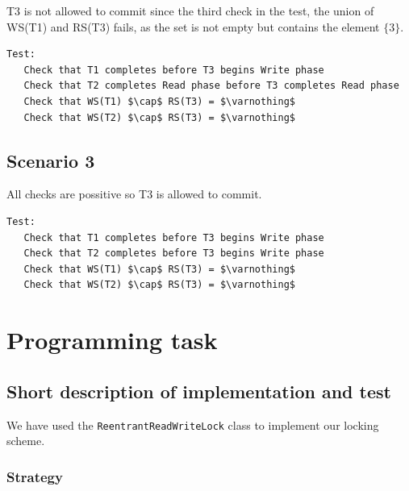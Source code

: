 \documentclass{article}
\theoremstyle{plain}
\theoremstyle{nonumberplain}
\begin{document}
T3 is not allowed to commit since the third check in the test, the union of WS(T1) and RS(T3) fails, as the set is not empty but contains the element $\{3\}$.
\begin{lstlisting}[mathescape]
Test:
   Check that T1 completes before T3 begins Write phase
   Check that T2 completes Read phase before T3 completes Read phase
   Check that WS(T1) $\cap$ RS(T3) = $\varnothing$
   Check that WS(T2) $\cap$ RS(T3) = $\varnothing$
\end{lstlisting}

\subsection{Scenario 3}

All checks are possitive so T3 is allowed to commit. 

\begin{lstlisting}[mathescape]
Test:
   Check that T1 completes before T3 begins Write phase
   Check that T2 completes before T3 begins Write phase
   Check that WS(T1) $\cap$ RS(T3) = $\varnothing$
   Check that WS(T2) $\cap$ RS(T3) = $\varnothing$
\end{lstlisting}

\section{Programming task}

\subsection{Short description of implementation and test}
We have used the \verb|ReentrantReadWriteLock| class to implement our locking scheme.

\subsubsection{Strategy}
\end{document}
